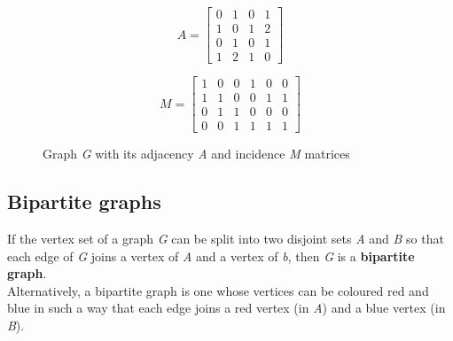 \begin{figure}[H]
    \centering
    \begin{minipage}{0.5\textwidth}
        \centering
    \end{minipage}%
    \begin{minipage}{0.5\textwidth}
        \[
        A = \begin{bmatrix}
        0 & 1 & 0 & 1 \\
        1 & 0 & 1 & 2 \\
        0 & 1 & 0 & 1 \\
        1 & 2 & 1 & 0
        \end{bmatrix}
        \]
        
        \[
        M = \begin{bmatrix}
        1 & 0 & 0 & 1 & 0 & 0 \\
        1 & 1 & 0 & 0 & 1 & 1 \\
        0 & 1 & 1 & 0 & 0 & 0 \\
        0 & 0 & 1 & 1 & 1 & 1
        \end{bmatrix}
        \]
    \end{minipage}
    \caption{Graph \textit{G} with its adjacency \textit{A} and incidence \textit{M} matrices}
    \label{fig:matrix_representations}
\end{figure}


\subsection{Bipartite graphs}
If the vertex set of a graph \textit{G} can be split into two disjoint sets \textit{A} and \textit{B} so that each
edge of \textit{G} joins a vertex of \textit{A} and a vertex of \textit{b}, then \textit{G} is a \textbf{bipartite graph}. \\
Alternatively, a bipartite graph is one whose vertices can be coloured red and blue in such a way that each edge joins a red vertex (in \textit{A}) and a blue vertex (in \textit{B}). \\

